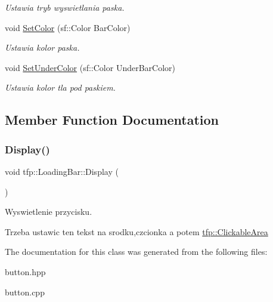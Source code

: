 \begin{DoxyCompactItemize}
\begin{DoxyCompactList}\small\item\em Ustawia tryb wyswietlania paska. \end{DoxyCompactList}\item 
\mbox{\label{classtfp_1_1_loading_bar_ae20bc0b6b153404a8fabb9206fd7dd5f}} 
void \mbox{\hyperlink{classtfp_1_1_loading_bar_ae20bc0b6b153404a8fabb9206fd7dd5f}{Set\+Color}} (sf\+::\+Color Bar\+Color)
\begin{DoxyCompactList}\small\item\em Ustawia kolor paska. \end{DoxyCompactList}\item 
\mbox{\label{classtfp_1_1_loading_bar_af906bdff041f8f70145fad9e56efb027}} 
void \mbox{\hyperlink{classtfp_1_1_loading_bar_af906bdff041f8f70145fad9e56efb027}{Set\+Under\+Color}} (sf\+::\+Color Under\+Bar\+Color)
\begin{DoxyCompactList}\small\item\em Ustawia kolor tla pod paskiem. \end{DoxyCompactList}\end{DoxyCompactItemize}


\subsection{Member Function Documentation}
\mbox{\label{classtfp_1_1_loading_bar_a172f4193878f9bb66af5e1307e6e434d}} 
\subsubsection{\texorpdfstring{Display()}{Display()}}
{\footnotesize\ttfamily void tfp\+::\+Loading\+Bar\+::\+Display (\begin{DoxyParamCaption}{ }\end{DoxyParamCaption})}



Wyswietlenie przycisku. 

Trzeba ustawic ten tekst na srodku,czcionka a potem \mbox{\hyperlink{classtfp_1_1_clickable_area}{tfp\+::\+Clickable\+Area}} 

The documentation for this class was generated from the following files\+:\begin{DoxyCompactItemize}
\item 
button.\+hpp\item 
button.\+cpp\end{DoxyCompactItemize}

